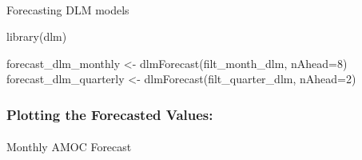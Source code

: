 \documentclass[
  11pt,
]{article}
\makeatletter
\let\oldparagraph\paragraph
\renewcommand{\paragraph}{
    \@ifstar
      \xxxParagraphStar
      \xxxParagraphNoStar
  }
\newcommand{\xxxParagraphStar}[1]{\oldparagraph*{#1}\mbox{}}
\newcommand{\xxxParagraphNoStar}[1]{\oldparagraph{#1}\mbox{}}
\newenvironment{Shaded}{\begin{snugshade}}{\end{snugshade}}
\newcommand{\AttributeTok}[1]{\textcolor[rgb]{0.40,0.45,0.13}{#1}}
\newcommand{\DecValTok}[1]{\textcolor[rgb]{0.68,0.00,0.00}{#1}}
\newcommand{\FunctionTok}[1]{\textcolor[rgb]{0.28,0.35,0.67}{#1}}
\newcommand{\NormalTok}[1]{\textcolor[rgb]{0.00,0.23,0.31}{#1}}
\newcommand{\OtherTok}[1]{\textcolor[rgb]{0.00,0.23,0.31}{#1}}
\makeatother
\begin{document}
\paragraph{Forecasting DLM models}\label{forecasting-dlm-models}

\begin{Shaded}
\begin{Highlighting}[]
\FunctionTok{library}\NormalTok{(dlm)}

\NormalTok{forecast\_dlm\_monthly }\OtherTok{\textless{}{-}} \FunctionTok{dlmForecast}\NormalTok{(filt\_month\_dlm, }\AttributeTok{nAhead=}\DecValTok{8}\NormalTok{)}
\NormalTok{forecast\_dlm\_quarterly }\OtherTok{\textless{}{-}} \FunctionTok{dlmForecast}\NormalTok{(filt\_quarter\_dlm, }\AttributeTok{nAhead=}\DecValTok{2}\NormalTok{)}
\end{Highlighting}
\end{Shaded}

\subsubsection{Plotting the Forecasted
Values:}\label{plotting-the-forecasted-values}

\paragraph{Monthly AMOC Forecast}\label{monthly-amoc-forecast}
\end{document}

